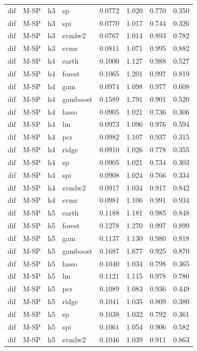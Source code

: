 \begin{ThreePartTable}
\begin{longtable}[t]{llclcccc}
dif & M-SP & h3 & sp & 0.0772 & 1.020 & 0.770 & 0.350\\
dif & M-SP & h3 & spi & 0.0770 & 1.017 & 0.744 & 0.326\\
dif & M-SP & h3 & svmlw2 & 0.0767 & 1.014 & 0.893 & 0.782\\
dif & M-SP & h3 & svmr & 0.0811 & 1.071 & 0.995 & 0.882\\
\addlinespace
dif & M-SP & h4 & earth & 0.1000 & 1.127 & 0.988 & 0.527\\
dif & M-SP & h4 & forest & 0.1065 & 1.201 & 0.997 & 0.819\\
dif & M-SP & h4 & gam & 0.0974 & 1.098 & 0.977 & 0.608\\
dif & M-SP & h4 & gamboost & 0.1589 & 1.791 & 0.901 & 0.520\\
dif & M-SP & h4 & lasso & 0.0905 & 1.021 & 0.736 & 0.306\\
dif & M-SP & h4 & lm & 0.0973 & 1.096 & 0.976 & 0.594\\
dif & M-SP & h4 & pcr & 0.0982 & 1.107 & 0.937 & 0.315\\
dif & M-SP & h4 & ridge & 0.0910 & 1.026 & 0.778 & 0.355\\
dif & M-SP & h4 & sp & 0.0905 & 1.021 & 0.734 & 0.303\\
dif & M-SP & h4 & spi & 0.0908 & 1.024 & 0.766 & 0.334\\
dif & M-SP & h4 & svmlw2 & 0.0917 & 1.034 & 0.917 & 0.842\\
dif & M-SP & h4 & svmr & 0.0981 & 1.106 & 0.991 & 0.934\\
\addlinespace
dif & M-SP & h5 & earth & 0.1188 & 1.181 & 0.985 & 0.848\\
dif & M-SP & h5 & forest & 0.1278 & 1.270 & 0.997 & 0.899\\
dif & M-SP & h5 & gam & 0.1137 & 1.130 & 0.980 & 0.818\\
dif & M-SP & h5 & gamboost & 0.1687 & 1.677 & 0.925 & 0.870\\
dif & M-SP & h5 & lasso & 0.1040 & 1.034 & 0.798 & 0.365\\
dif & M-SP & h5 & lm & 0.1121 & 1.115 & 0.978 & 0.780\\
dif & M-SP & h5 & pcr & 0.1089 & 1.083 & 0.936 & 0.449\\
dif & M-SP & h5 & ridge & 0.1041 & 1.035 & 0.809 & 0.380\\
dif & M-SP & h5 & sp & 0.1038 & 1.032 & 0.792 & 0.361\\
dif & M-SP & h5 & spi & 0.1061 & 1.054 & 0.906 & 0.582\\
dif & M-SP & h5 & svmlw2 & 0.1046 & 1.039 & 0.911 & 0.863\\

\end{longtable}
\end{ThreePartTable}
